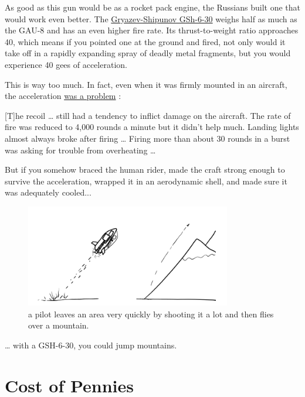 {As good as this gun would be as a rocket pack engine, the Russians built one that would work even better. The \href{http://en.wikipedia.org/wiki/Gryazev-Shipunov\_GSh-6-30}{Gryazev-Shipunov GSh-6-30} weighs half as much as the GAU-8 and has an even higher fire rate. Its thrust-to-weight ratio approaches 40, which means if you pointed one at the ground and fired, not only would it take off in a rapidly expanding spray of deadly metal fragments, but you would experience 40 gees of acceleration.}

{This is way too much. In fact, even when it was firmly mounted in an aircraft, the acceleration \href{http://www.airvectors.net/avmig23\_2.html\#m4}{was a problem} :}

{[T]he recoil … still had a tendency to inflict damage on the aircraft. The rate of fire was reduced to 4,000 rounds a minute but it didn't help much. Landing lights almost always broke after firing … Firing more than about 30 rounds in a burst was asking for trouble from overheating …}

{But if you somehow braced the human rider, made the craft strong enough to survive the acceleration, wrapped it in an aerodynamic shell, and made sure it was adequately cooled...}

\begin{figure}[!htbp]
\centering
\includegraphics[scale=0.5, max width=0.8\textwidth]{imgs/a/21/jetpack_mountains.png}
\caption{a pilot leaves an area very quickly by shooting it a lot and then flies over a mountain.}
\end{figure}

{… with a GSH-6-30, you could jump mountains.}

{
\chapter{Cost of Pennies}
}

